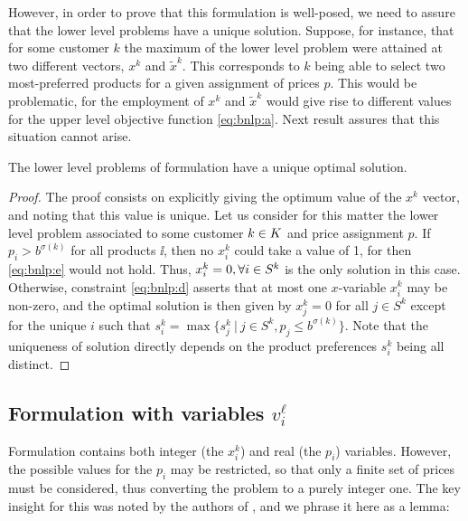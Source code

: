 However, in order to prove that this formulation is well-posed, we need to
assure that the lower level problems have a unique solution. Suppose, for
instance, that for some customer $k$ the maximum of the lower level problem were
attained at two different vectors, $x^k$ and $\tilde{x}^k$. This corresponds to
$k$ being able to select two most-preferred products for a given assignment of
prices $p$. This would be problematic, for the employment of $x^k$ and
$\tilde{x}^k$ would give rise to different values for the upper level objective
function \eqref{eq:bnlp:a}. Next result assures that this situation cannot
arise.

\begin{proposition}
    The lower level problems of formulation \bnlp have a unique optimal
    solution.
\end{proposition}

\begin{proof}
    The proof consists on explicitly giving the optimum value of the $x^k$
    vector, and noting that this value is unique.  Let us consider for this
    matter the lower level problem associated to some customer ${k \in K}$ and price
    assignment $p$. If $p_i > b^{\sigma(k)}$ for all products $\ii$, then no
    $x_i^k$ could take a value of 1, for then \eqref{eq:bnlp:e} would not hold.
    Thus, $x_i^k=0, \forall{\ensuremath{i \in S^k}}$ is the only solution in this case.  Otherwise,
    constraint \eqref{eq:bnlp:d} asserts that at most one $x$-variable $x_i^k$
    may be non-zero, and the optimal solution is then given by $x_j^k=0$ for all
    $j\in S^k$ except for the unique $i$ such that $s_i^k=\max\{s_j^k~|~j\in
    S^k, p_j\leq b^{\sigma(k)}\}$. Note that the uniqueness of solution directly
    depends on the product preferences $s_i^k$ being all distinct.
\end{proof}

\subsection{Formulation with variables $v_i^\ell$} %
\label{ssc:pf:bf:bnlv}

Formulation \bnlp contains both integer (the $x_i^k$) and real (the $p_i$)
variables. However, the possible values for the $p_i$ may be restricted, so that
only a finite set of prices must be considered, thus converting the problem to a
purely integer one. The key insight for this was noted by the authors of
\cite{ru:nonparametric}, and we phrase it here as a lemma:

